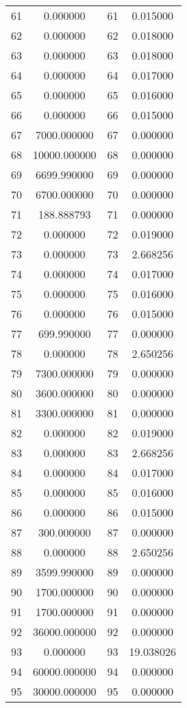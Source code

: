 \documentclass[12pt]{article}
\begin{document}
\begin{longtable}{@{}cccc@{}}
61 & 0.000000 & 61 & 0.015000 \\
62 & 0.000000 & 62 & 0.018000 \\
63 & 0.000000 & 63 & 0.018000 \\
64 & 0.000000 & 64 & 0.017000 \\
65 & 0.000000 & 65 & 0.016000 \\
66 & 0.000000 & 66 & 0.015000 \\
67 & 7000.000000 & 67 & 0.000000 \\
68 & 10000.000000 & 68 & 0.000000 \\
69 & 6699.990000 & 69 & 0.000000 \\
70 & 6700.000000 & 70 & 0.000000 \\
71 & 188.888793 & 71 & 0.000000 \\
72 & 0.000000 & 72 & 0.019000 \\
73 & 0.000000 & 73 & 2.668256 \\
74 & 0.000000 & 74 & 0.017000 \\
75 & 0.000000 & 75 & 0.016000 \\
76 & 0.000000 & 76 & 0.015000 \\
77 & 699.990000 & 77 & 0.000000 \\
78 & 0.000000 & 78 & 2.650256 \\
79 & 7300.000000 & 79 & 0.000000 \\
80 & 3600.000000 & 80 & 0.000000 \\
81 & 3300.000000 & 81 & 0.000000 \\
82 & 0.000000 & 82 & 0.019000 \\
83 & 0.000000 & 83 & 2.668256 \\
84 & 0.000000 & 84 & 0.017000 \\
85 & 0.000000 & 85 & 0.016000 \\
86 & 0.000000 & 86 & 0.015000 \\
87 & 300.000000 & 87 & 0.000000 \\
88 & 0.000000 & 88 & 2.650256 \\
89 & 3599.990000 & 89 & 0.000000 \\
90 & 1700.000000 & 90 & 0.000000 \\
91 & 1700.000000 & 91 & 0.000000 \\
92 & 36000.000000 & 92 & 0.000000 \\
93 & 0.000000 & 93 & 19.038026 \\
94 & 60000.000000 & 94 & 0.000000 \\
95 & 30000.000000 & 95 & 0.000000 \\

\end{longtable}
\end{document}
